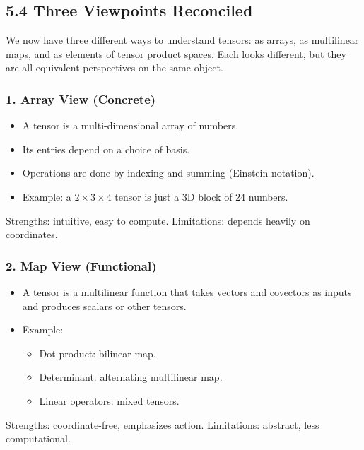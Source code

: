 \documentclass[
  letterpaper,
  DIV=11,
  numbers=noendperiod]{scrreprt}
\providecommand{\tightlist}{%
  \setlength{\itemsep}{0pt}\setlength{\parskip}{0pt}}
\begin{document}
\subsection{5.4 Three Viewpoints
Reconciled}\label{three-viewpoints-reconciled}

We now have three different ways to understand tensors: as arrays, as
multilinear maps, and as elements of tensor product spaces. Each looks
different, but they are all equivalent perspectives on the same object.

\subsubsection{1. Array View (Concrete)}\label{array-view-concrete}

\begin{itemize}
\tightlist
\item
  A tensor is a multi-dimensional array of numbers.
\item
  Its entries depend on a choice of basis.
\item
  Operations are done by indexing and summing (Einstein notation).
\item
  Example: a \(2 \times 3 \times 4\) tensor is just a 3D block of \(24\)
  numbers.
\end{itemize}

Strengths: intuitive, easy to compute. Limitations: depends heavily on
coordinates.

\subsubsection{2. Map View (Functional)}\label{map-view-functional}

\begin{itemize}
\item
  A tensor is a multilinear function that takes vectors and covectors as
  inputs and produces scalars or other tensors.
\item
  Example:

  \begin{itemize}
  \tightlist
  \item
    Dot product: bilinear map.
  \item
    Determinant: alternating multilinear map.
  \item
    Linear operators: mixed tensors.
  \end{itemize}
\end{itemize}

Strengths: coordinate-free, emphasizes action. Limitations: abstract,
less computational.
\end{document}
